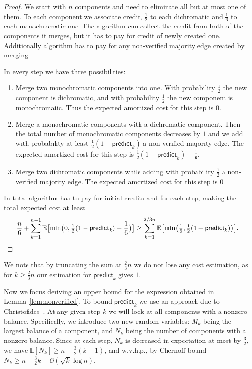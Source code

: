 \documentclass{article}[11pt,a4paper]
\newcommand{\bigo}{\mathcal{O}}
\newcommand{\predict}{\mathsf{predict}}
\newcommand{\E}{\mathbb{E}}
\begin{document}
\begin{proof}
We start with $n$ components and need to eliminate all but at most one
of them. To each component we associate credit, $\frac{1}{2}$ to each dichromatic and $\frac{1}{6}$ to each monochromatic one. The algorithm can collect the credit from both of the components it merges, but it has to pay for credit of newly created one. Additionally algorithm has to pay for any non-verified majority edge created by merging.

In every step we have three possibilities:
\begin{enumerate}
\item Merge two monochromatic components into one. With probability $\frac{1}{2}$ the new component is dichromatic, and with probability $\frac{1}{2}$ the new component is monochromatic. Thus the expected amortized cost for this step is $0$.
\item Merge a monochromatic components with a dichromatic component. Then the total
number of monochromatic components decreases by $1$ and we add with probability at least $\frac{1}{2}(1-\predict_k)$ a non-verified majority edge. The expected amortized cost for this step is $\frac{1}{2}(1-\predict_k) - \frac16$.
\item Merge two dichromatic components while adding with probability $\frac{1}{2}$ a non-verified majority edge. The expected amortized cost for this step is $0$.
\end{enumerate}
In total algorithm has to pay for initial credits and for each step, making the total expected cost at least
\[\frac{n}6 + \sum_{k=1}^{n-1} \E\bigl[\min\bigl(0,\tfrac{1}{2}(1-\predict_k) - \frac16\bigr)\bigr] \ge  \sum_{k=1}^{2/3n} \E\bigl[\min\bigl(\tfrac{1}{6},\tfrac{1}{2}(1-\predict_k)\bigr) \bigr].  \qedhere \]
\end{proof}
We note that by truncating the sum at $\frac23n$ we do not lose any cost estimation, as for $k \ge \frac23n$ our estimation for $\predict_k$ gives $1$. 

Now we focus deriving an upper bound for the expression obtained in Lemma~\ref{lem:nonverified}.
To bound $\predict_k$ we use an approach due to Christofides~\cite{Christofides}.
At any given step $k$ we will look at all components with a nonzero balance. Specifically, we introduce two new random variables: $M_k$ being the largest balance of a component, and $N_k$ being the number of components with a nonzero balance. Since at each step, $N_k$ is decreased in expectation at most by $\frac32$, we have
$\E[N_k] \ge n - \frac32(k-1)$,
and w.v.h.p., by Chernoff bound
$N_k \ge n - \frac32k - \bigo(\sqrt{k} \log n)$.
\end{document}
